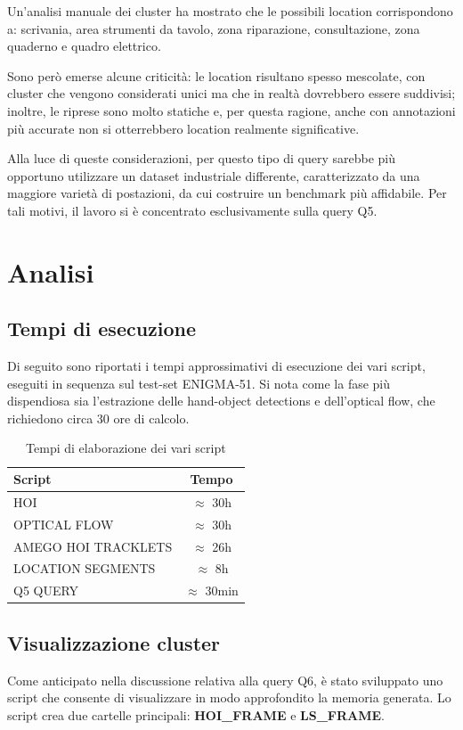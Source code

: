 Un'analisi manuale dei cluster ha mostrato che le possibili location corrispondono a: scrivania, area strumenti da tavolo, zona riparazione, consultazione, zona quaderno e quadro elettrico.  

Sono però emerse alcune criticità: le location risultano spesso mescolate, con cluster che vengono considerati unici ma che in realtà dovrebbero essere suddivisi; inoltre, le riprese sono molto statiche e, per questa ragione, anche con annotazioni più accurate non si otterrebbero location realmente significative.  

Alla luce di queste considerazioni, per questo tipo di query sarebbe più opportuno utilizzare un dataset industriale differente, caratterizzato da una maggiore varietà di postazioni, da cui costruire un benchmark più affidabile. Per tali motivi, il lavoro si è concentrato esclusivamente sulla query Q5.

\section{Analisi}

\subsection*{Tempi di esecuzione}

Di seguito sono riportati i tempi approssimativi di esecuzione dei vari script, eseguiti in sequenza sul test-set ENIGMA-51.
Si nota come la fase più dispendiosa sia l'estrazione delle hand-object detections e dell'optical flow, che richiedono circa 30 ore di calcolo.

\begin{table}[ht]
    \centering
    \caption{Tempi di elaborazione dei vari script}
    \begin{tabular}{|l|c|}
        \hline
        \textbf{Script} & \textbf{Tempo} \\
        \hline
        HOI & $\approx$ 30h \\
        OPTICAL FLOW & $\approx$ 30h \\
        AMEGO HOI TRACKLETS & $\approx$ 26h \\
        LOCATION SEGMENTS & $\approx$ 8h \\
        Q5 QUERY & $\approx$ 30min \\
        \hline
    \end{tabular}
    \label{tab:tempi}
\end{table}

\subsection*{Visualizzazione cluster}
Come anticipato nella discussione relativa alla query Q6, è stato sviluppato uno script che consente di visualizzare in modo approfondito la memoria generata. Lo script crea due cartelle principali: \textbf{HOI\_FRAME} e \textbf{LS\_FRAME}.  


